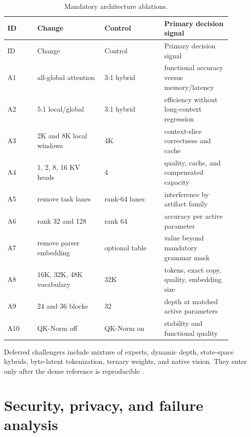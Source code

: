 \documentclass[10pt,letterpaper]{article}
\newcommand{\1}{\mathbb{1}}
\begin{document}
\begin{longtable}{@{}L{0.12\linewidth}L{0.27\linewidth}L{0.24\linewidth}L{0.27\linewidth}@{}}
\caption{Mandatory architecture ablations.}\label{tab:ablations}\\
\toprule ID & Change & Control & Primary decision signal \\
\midrule
\endfirsthead
\toprule ID & Change & Control & Primary decision signal \\
\midrule
\endhead
A1 & all-global attention & 3:1 hybrid & functional accuracy versus memory/latency \\
A2 & 5:1 local/global & 3:1 hybrid & efficiency without long-context regression \\
A3 & 2K and 8K local windows & 4K & context-slice correctness and cache \\
A4 & 1, 2, 8, 16 KV heads & 4 & quality, cache, and compensated capacity \\
A5 & remove task lanes & rank-64 lanes & interference by artifact family \\
A6 & rank 32 and 128 & rank 64 & accuracy per active parameter \\
A7 & remove parser embedding & optional table & value beyond mandatory grammar mask \\
A8 & 16K, 32K, 48K vocabulary & 32K & tokens, exact copy, quality, embedding size \\
A9 & 24 and 36 blocks & 32 & depth at matched active parameters \\
A10 & QK-Norm off & QK-Norm on & stability and functional quality \\
\bottomrule
\end{longtable}

Deferred challengers include mixture of experts, dynamic depth, state-space hybrids, byte-latent
tokenization, ternary weights, and native vision.  They enter only after the dense reference is
reproducible \cite{raposo2024mod,dao2024mamba2,pagnoni2024blt,ma2024bitnet}.

\section{Security, privacy, and failure analysis}
\end{document}
